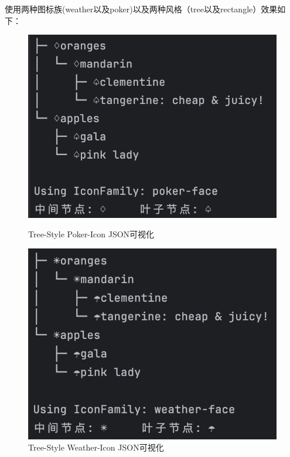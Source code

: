 \documentclass[hyperref,a4paper,UTF8]{ctexart}
\begin{document}
使用两种图标族(weather以及poker)以及两种风格（tree以及rectangle）效果如下：


\begin{figure}[htbp]
\centering
\begin{minipage}[t]{0.48\textwidth}
    \centering
    \includegraphics[width=\textwidth]{figures/tre-pok.png}
    \caption{Tree-Style Poker-Icon JSON可视化}
    \label{fig:tre-pok}
\end{minipage}
\hfill
\begin{minipage}[t]{0.48\textwidth}
    \centering
    \includegraphics[width=\textwidth]{figures/tre-wea.png}
    \caption{Tree-Style Weather-Icon JSON可视化}
    \label{fig:tre-wea}
\end{minipage}
\end{figure}
\end{document}
